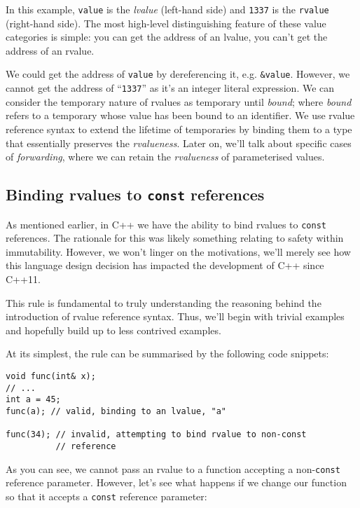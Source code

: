 	In this example, \texttt{value} is the \textit{lvalue} (left-hand side) and
	\texttt{1337} is the \texttt{rvalue} (right-hand side). The most high-level
	distinguishing feature of these value categories is simple: you can get the
	address of an lvalue, you can't get the address of an rvalue.\par

	We could get the address of \texttt{value} by dereferencing it, e.g.
	\texttt{\&value}. However, we cannot get the address of ``\texttt{1337}'' as
	it's an integer literal expression. We can consider the temporary nature of
	rvalues as temporary until \textit{bound}; where \textit{bound} refers to a
	temporary whose value has been bound to an identifier. We use rvalue
	reference syntax to extend the lifetime of temporaries by binding them to a
	type that essentially preserves the \textit{rvalueness}. Later on, we'll
	talk about specific cases of \textit{forwarding}, where we can retain the
	\textit{rvalueness} of parameterised values.
	
	\subsection{Binding rvalues to \texttt{const} references}	
	 
	 	As mentioned earlier, in C++ we have the ability to bind rvalues to
		\texttt{const} references. The rationale for this was likely something
		relating to safety within immutability. However, we won't linger on the
		motivations, we'll merely see how this language design decision has
		impacted the development of C++ since C++11.

		This rule is fundamental to truly understanding the reasoning behind the
		introduction of rvalue reference syntax. Thus, we'll begin with trivial
		examples and hopefully build up to less contrived examples.

		At its simplest, the rule can be summarised by the following code
		snippets:

		\begin{verbatim}
void func(int& x);
// ...
int a = 45;
func(a); // valid, binding to an lvalue, "a"

func(34); // invalid, attempting to bind rvalue to non-const
          // reference
		\end{verbatim}

		As you can see, we cannot pass an rvalue to a function accepting a
		non-\texttt{const} reference parameter. However, let's see what happens
		if we change our function so that it accepts a \texttt{const} reference
		parameter:

